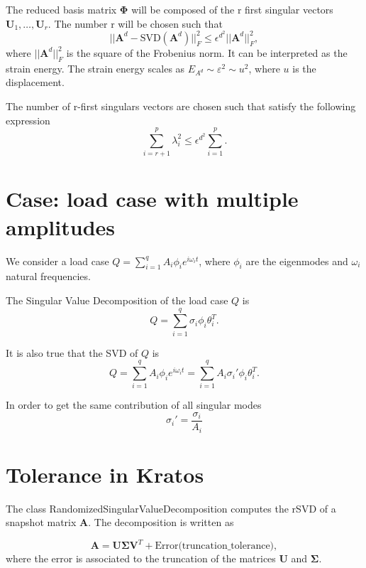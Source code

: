 \documentclass{article}
\begin{document}
The reduced basis matrix $\bm{\Phi}$ will be composed of the r first singular vectors $\bm{U}_1, \dots, \bm{U}_r$. The number r will be chosen such that 
\begin{equation}
  ||\bm{A}^d - \text{SVD}(\bm{A}^d)||_F^2 \leq \epsilon^{d^2} ||\bm{A}^d||_F^2,
  \label{eq:norm_matrix}
\end{equation}
where $||\bm{A}^d||_F^2$ is the square of the Frobenius norm. It can be interpreted as the strain energy. The strain energy scales as $E_{A^d} \sim \varepsilon^2 \sim u^2$, where $u$ is the displacement.\newline

The number of r-first singulars vectors are chosen such that satisfy the following expression
\begin{equation}
 \sum_{i=r+1}^p \lambda_i^2 \leq \epsilon^{d^2} \sum_{i=1}^p.
\end{equation}

\section{Case: load case with multiple amplitudes}
We consider a load case $Q = \sum_{i=1}^q A_i \phi_i e^{i \omega_i t}$, where $\phi_i$ are the eigenmodes and $\omega_i$ natural frequencies. \newline

The Singular Value Decomposition of the load case $Q$ is 
\begin{equation}
  Q = \sum_{i=1}^q \sigma_i \phi_i \theta_i^T.
\end{equation}

It is also true that the SVD of $Q$ is
\begin{equation}
  Q = \sum_{i=1}^q A_i \phi_i e^{i \omega_i t} = \sum_{i=1}^q A_i \sigma_i' \phi_i \theta_i^T.
\end{equation}

In order to get the same contribution of all singular modes
\begin{equation}
  \sigma_i' = \frac{\sigma_i}{A_i}
\end{equation}

\section{Tolerance in Kratos}
The class RandomizedSingularValueDecomposition computes the rSVD of a snapshot matrix $\bm{A}$. The decomposition is written as

\begin{equation}
  \bm{A} = \bm{U} \bm{\Sigma} \bm{V}^T + \text{Error(truncation\_tolerance)},
\end{equation}
where the error is associated to the truncation of the matrices $\bm{U}$ and $\bm{\Sigma}$.\newline
\end{document}
